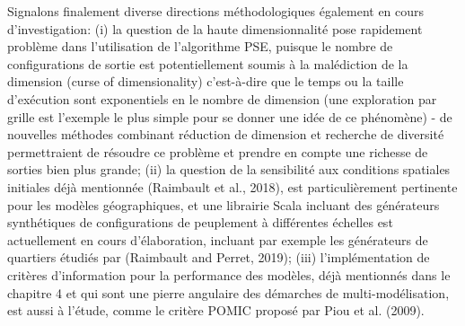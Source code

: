 \documentclass[10pt]{article}
\begin{document}
Signalons finalement diverse directions méthodologiques également en cours d’investigation: (i) la question de la haute dimensionnalité pose rapidement problème dans l’utilisation de l’algorithme PSE, puisque le nombre de configurations de sortie est potentiellement soumis à la malédiction de la dimension (curse of dimensionality) c’est-à-dire que le temps ou la taille d'exécution sont exponentiels en le nombre de dimension (une exploration par grille est l’exemple le plus simple pour se donner une idée de ce phénomène) - de nouvelles méthodes combinant réduction de dimension et recherche de diversité permettraient de résoudre ce problème et prendre en compte une richesse de sorties bien plus grande; (ii) la question de la sensibilité aux conditions spatiales initiales déjà mentionnée (Raimbault et al., 2018), est particulièrement pertinente pour les modèles géographiques, et une librairie Scala incluant des générateurs synthétiques de configurations de peuplement à différentes échelles est actuellement en cours d'élaboration, incluant par exemple les générateurs de quartiers étudiés par (Raimbault and Perret, 2019); (iii) l'implémentation de critères d’information pour la performance des modèles, déjà mentionnés dans le chapitre 4 et qui sont une pierre angulaire des démarches de multi-modélisation, est aussi à l'étude, comme le critère POMIC proposé par Piou et al. (2009).
\end{document}

